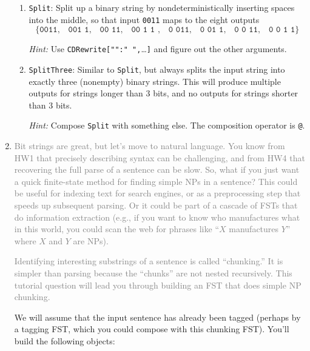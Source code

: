 \documentclass[11pt]{article}
\makeatletter
\newcommand{\atsign}{{\makeatletter @\makeatother}}
\newcommand{\handinecsym}{\color{blue}{\Large\ding{44}}}  %
\newcounter{handin}
\newcommand{\handinec}{\stepcounter{handin}\hspace{0pt}\marginpar{\hfill\handinecsym$_{\arabic{handin}}$}}
\makeatother
\begin{document}
\begin{enumerate}[resume]
\begin{enumerate}
  \item \texttt{Split}: Split up a binary string by
    nondeterministically inserting spaces into the middle, so that
    input {\tt 0011} maps to the eight outputs $$\{\texttt{0011},\;\;\;
    \texttt{001~1},\;\;\; \texttt{00~11},\;\;\; \texttt{00~1~1 },\;\;\;
    \texttt{0~011},\;\;\; \texttt{0~01~1},\;\;\; \texttt{0~0~11},\;\;\;
    \texttt{0~0~1~1}\}$$

    {\em Hint:} Use \verb|CDRewrite["":" ",|\ldots\verb|]| and
    figure out the other arguments.

  \item \handinec {\bf Extra credit:} \texttt{SplitThree}: Similar to {\tt Split}, but always
    splits the input string into exactly three (nonempty) binary
    strings.  This will produce multiple outputs for strings longer
    than 3 bits, and no outputs for strings shorter than 3 bits.

    {\em Hint:} Compose {\tt Split} with something else.
    The composition operator is \texttt{\atsign}.


  \end{enumerate}

\item \label{q:np} \textcolor{gray}{Bit strings are great, but let's move to
  natural language.  You know from HW1 that precisely
  describing syntax can be challenging, and from HW4 that
  recovering the full parse of a sentence can be slow.  So, what if you
  just want a quick finite-state method for finding simple NPs in a
  sentence?  This could be useful for indexing text for search
  engines, or as a preprocessing step that speeds up subsequent
  parsing.  Or it could be part of a cascade of FSTs that do
  information extraction (e.g., if you want to know who manufactures
  what in this world, you could scan the web for phrases like ``$X$
  manufactures $Y$'' where $X$ and $Y$ are NPs).}

  \textcolor{gray}{Identifying interesting substrings of a sentence is called
  ``chunking.''  It is simpler than parsing because the ``chunks'' are
  not nested recursively.  This tutorial question will lead you
  through building an FST that does simple NP chunking.}

  We will assume that the input sentence has already been tagged
  (perhaps by a tagging FST, which you could compose with this
  chunking FST).  You'll build the following objects:
  \begin{itemize}


\end{itemize}
\end{enumerate}
\end{document}
